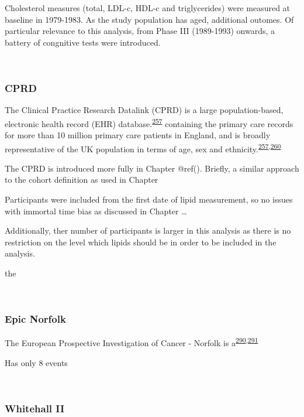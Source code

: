 \documentclass[a4paper, twoside]{templates/ociamthesis}
\begin{document}
Cholesterol measures (total, LDL-c, HDL-c and triglycerides) were measured at baseline in 1979-1983.
As the study population has aged, additional outomes. Of particular relevance to this analysis, from Phase III (1989-1993) onwards, a battery of congnitive tests were introduced.

~

\hypertarget{cprd}{%
\subsubsection{CPRD}\label{cprd}}

The Clinical Practice Research Datalink (CPRD) is a large population-based, electronic health record (EHR) database.\textsuperscript{\protect\hyperlink{ref-herrett2015}{257}} containing the primary care records for more than 10 million primary care patients in England, and is broadly representative of the UK population in terms of age, sex and ethnicity.\textsuperscript{\protect\hyperlink{ref-herrett2015}{257},\protect\hyperlink{ref-mathur2014}{260}}

The CPRD is introduced more fully in Chapter @ref(). Briefly, a similar approach to the cohort definition as used in Chapter

Participants were included from the first date of lipid measurement, so no issues with immortal time bias as discussed in Chapter \ldots{}

Additionally, ther number of participants is larger in this analysis as there is no restriction on the level which lipids should be in order to be included in the analysis.

the

~

\hypertarget{epic-norfolk}{%
\subsubsection{Epic Norfolk}\label{epic-norfolk}}

The European Prospective Investigation of Cancer - Norfolk is a\textsuperscript{\protect\hyperlink{ref-riboli1997}{290},\protect\hyperlink{ref-riboli2002}{291}}

Has only 8 events

~

\hypertarget{whitehall-ii}{%
\subsubsection{Whitehall II}\label{whitehall-ii}}
\end{document}

